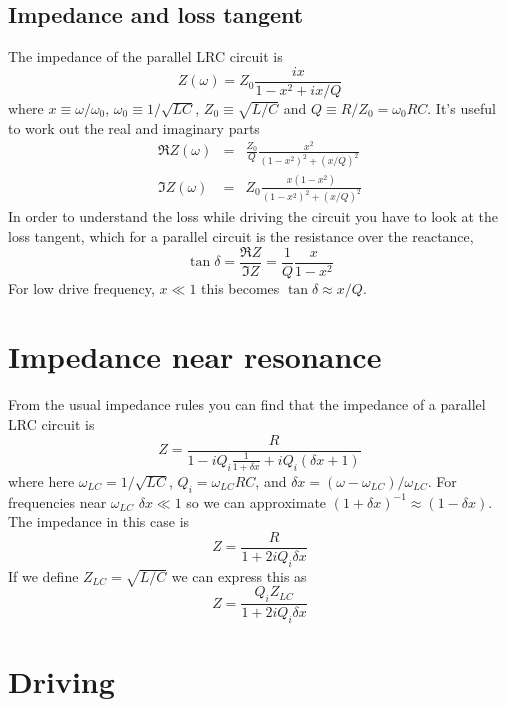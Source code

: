 \documentclass{article}
\begin{document}
\subsection{Impedance and loss tangent}

The impedance of the parallel LRC circuit is\begin{equation}
Z(\omega)=Z_{0}\frac{ix}{1-x^{2}+ix/Q}\end{equation}
where $x\equiv\omega/\omega_{0}$, $\omega_{0}\equiv1/\sqrt{LC}$, $Z_{0}\equiv\sqrt{L/C}$ and $Q\equiv R/Z_{0}=\omega_{0}RC$. It's
useful to work out the real and imaginary parts\begin{eqnarray*}
\Re Z(\omega) & = & \frac{Z_{0}}{Q}\frac{x^{2}}{(1-x^{2})^{2}+(x/Q)^{2}}\\
\Im Z(\omega) & = & Z_{0}\frac{x(1-x^{2})}{(1-x^{2})^{2}+(x/Q)^{2}}\end{eqnarray*}
In order to understand the loss while driving the circuit you have to look at the loss tangent, which for a parallel circuit is the resistance over the reactance,\begin{equation}
\tan\delta=\frac{\Re Z}{\Im Z}=\frac{1}{Q}\frac{x}{1-x^{2}}\end{equation}
For low drive frequency, $x\ll1$ this becomes $\tan\delta\approx x/Q$.


\section{Impedance near resonance}
From the usual impedance rules you can find that the impedance of a parallel LRC circuit is \begin{equation}
Z = \frac{R}{1-iQ_i \frac{1}{1+\delta x} +iQ_i(\delta x + 1)} \end{equation}
where here $\omega_{LC} = 1/\sqrt{LC}$, $Q_i = \omega_{LC} R C$, and $\delta x = (\omega-\omega_{LC})/\omega_{LC}$. For frequencies near $\omega_{LC}$ $\delta x \ll 1$ so we can approximate $(1+\delta x)^{-1} \approx (1-\delta x)$. The impedance in this case is \begin{equation}
Z = \frac{R}{1+2iQ_i \delta x} \end{equation}
If we define $Z_{LC} = \sqrt{L/C}$ we can express this as \begin{equation}
Z = \frac{Q_i Z_{LC}}{1+2iQ_i \delta x} \end{equation}

\section{Driving}
\end{document}
